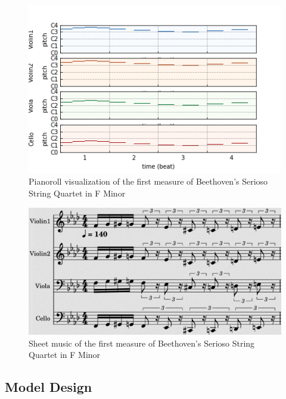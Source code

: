 \documentclass[sigconf,authorversion]{acmart}
\begin{document}
\begin{figure}[h]
  \centering
  \includegraphics[width=\linewidth]{figures/first_bar.png}
  \caption{Pianoroll visualization of the first measure of
    Beethoven's Serioso String Quartet in F Minor}
  \label{pianoroll}
\end{figure}

\begin{figure}[h]
  \centering
  \includegraphics[width=\linewidth]{figures/first_bar_sheet.png}
  \caption{Sheet music of the first measure of Beethoven's Serioso
    String Quartet in F Minor}
  \label{sheet}
\end{figure}

\subsection{Model Design}
\end{document}
